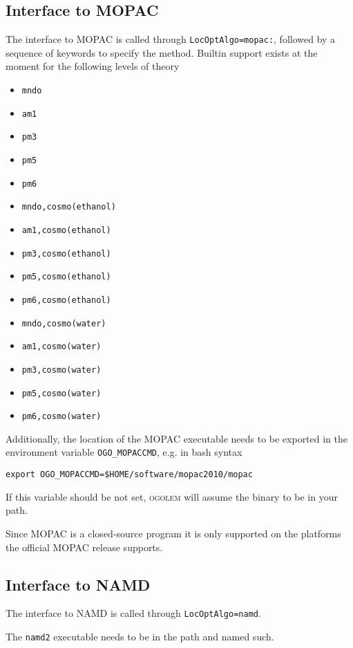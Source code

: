 \documentclass[a4paper,10pt]{scrbook}
\newcommand{\ogo}{\textsc{ogolem}}
\begin{document}
\subsection{Interface to MOPAC}
The interface to MOPAC is called through \texttt{LocOptAlgo=mopac:}, followed by
a sequence of keywords to specify the method. Builtin support exists at the
moment for the following levels of theory
\begin{itemize}
  \item \texttt{mndo}
  \item \texttt{am1}
  \item \texttt{pm3}
  \item \texttt{pm5}
  \item \texttt{pm6}
  \item \texttt{mndo,cosmo(ethanol)}
  \item \texttt{am1,cosmo(ethanol)}
  \item \texttt{pm3,cosmo(ethanol)}
  \item \texttt{pm5,cosmo(ethanol)}
  \item \texttt{pm6,cosmo(ethanol)}
  \item \texttt{mndo,cosmo(water)}
  \item \texttt{am1,cosmo(water)}
  \item \texttt{pm3,cosmo(water)}
  \item \texttt{pm5,cosmo(water)}
  \item \texttt{pm6,cosmo(water)}
\end{itemize}

Additionally, the location of the MOPAC executable needs to be exported in the
environment variable \texttt{OGO\_MOPACCMD}, e.g. in bash syntax
\begin{verbatim}
export OGO_MOPACCMD=$HOME/software/mopac2010/mopac
\end{verbatim}
If this variable should be not set, \ogo{} will assume the binary to be in
your path.

Since MOPAC is a closed-source program it is only supported on the platforms the
official MOPAC release supports.

\subsection{Interface to NAMD}

The interface to NAMD is called through \texttt{LocOptAlgo=namd}.

The \texttt{namd2} executable needs to be in the path and named such.
\end{document}
